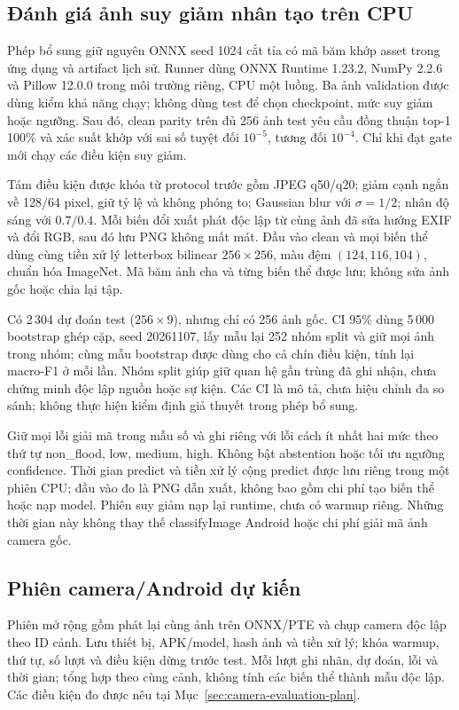 \subsection{Đánh giá ảnh suy giảm nhân tạo trên CPU}\label{sec:image-quality-cpu-setup}
Phép bổ sung giữ nguyên ONNX seed 1024 cắt tỉa có mã băm khớp asset trong ứng dụng và artifact lịch sử. Runner dùng ONNX Runtime 1.23.2, NumPy 2.2.6 và Pillow 12.0.0 trong môi trường riêng, CPU một luồng. Ba ảnh validation được dùng kiểm khả năng chạy; không dùng test để chọn checkpoint, mức suy giảm hoặc ngưỡng. Sau đó, clean parity trên đủ 256 ảnh test yêu cầu đồng thuận top-1 100\% và xác suất khớp với sai số tuyệt đối $10^{-5}$, tương đối $10^{-4}$. Chỉ khi đạt gate mới chạy các điều kiện suy giảm.

Tám điều kiện được khóa từ protocol trước gồm JPEG q50/q20; giảm cạnh ngắn về 128/64 pixel, giữ tỷ lệ và không phóng to; Gaussian blur với $\sigma=1/2$; nhân độ sáng với $0.7/0.4$. Mỗi biến đổi xuất phát độc lập từ cùng ảnh đã sửa hướng EXIF và đổi RGB, sau đó lưu PNG không mất mát. Đầu vào clean và mọi biến thể dùng cùng tiền xử lý letterbox bilinear $256\times256$, màu đệm $(124,116,104)$, chuẩn hóa ImageNet. Mã băm ảnh cha và từng biến thể được lưu; không sửa ảnh gốc hoặc chia lại tập.

Có 2\,304 dự đoán test ($256\times9$), nhưng chỉ có 256 ảnh gốc. CI 95\% dùng 5\,000 bootstrap ghép cặp, seed 20261107, lấy mẫu lại 252 nhóm split và giữ mọi ảnh trong nhóm; cùng mẫu bootstrap được dùng cho cả chín điều kiện, tính lại macro-F1 ở mỗi lần. Nhóm split giúp giữ quan hệ gần trùng đã ghi nhận, chưa chứng minh độc lập nguồn hoặc sự kiện. Các CI là mô tả, chưa hiệu chỉnh đa so sánh; không thực hiện kiểm định giả thuyết trong phép bổ sung.

Giữ mọi lỗi giải mã trong mẫu số và ghi riêng với lỗi cách ít nhất hai mức theo thứ tự non\_flood, low, medium, high. Không bật abstention hoặc tối ưu ngưỡng confidence. Thời gian predict và tiền xử lý cộng predict được lưu riêng trong một phiên CPU; đầu vào đo là PNG dẫn xuất, không bao gồm chi phí tạo biến thể hoặc nạp model. Phiên suy giảm nạp lại runtime, chưa có warmup riêng. Những thời gian này không thay thế classifyImage Android hoặc chi phí giải mã ảnh camera gốc.

\subsection{Phiên camera/Android dự kiến}\label{sec:camera-session-plan}
Phiên mở rộng gồm phát lại cùng ảnh trên ONNX/PTE và chụp camera độc lập theo ID cảnh. Lưu thiết bị, APK/model, hash ảnh và tiền xử lý; khóa warmup, thứ tự, số lượt và điều kiện dừng trước test. Mỗi lượt ghi nhãn, dự đoán, lỗi và thời gian; tổng hợp theo cùng cảnh, không tính các biến thể thành mẫu độc lập. Các điều kiện đo được nêu tại Mục~\ref{sec:camera-evaluation-plan}.

